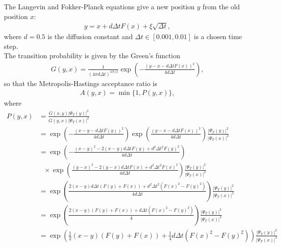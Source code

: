\documentclass[12pt]{article}
\begin{document}
\noindent The Langevin and Fokker-Planck equations give a new position $y$ from the old position $x$:
\begin{align}
y = x + d\Delta tF(x) + \xi \sqrt{\Delta t},
\end{align}
where $d=0.5$ is the diffusion constant and $\Delta t \in [0.001,0.01]$ is a chosen time step. \\

The transition probability is given by the Green's function
\begin{align}
G(y,x)=\frac{1}{(4\pi d \Delta t)^{3N/2}} \exp \left( -\frac{(y-x-d\Delta t F(x))^2}{4 d \Delta t} \right),
\end{align}
so that the Metropolis-Hastings acceptance ratio is
\begin{align}
A(y,x) = \min \{ 1, P(y,x) \},
\end{align}
where 
\begin{align*}
P(y,x) &= \frac{G(x,y) | \Psi_T(y) | ^2}{G(y,x) | \Psi_T(x) | ^2}\\
&= \exp \left( -\frac{(x-y-d\Delta t F(y))^2}{4 d \Delta t} \right) \exp \left( \frac{(y-x-d\Delta t F(x))^2}{4 d \Delta t} \right) \frac{| \Psi_T(y) | ^2}{ | \Psi_T(x) | ^2}\\
&= \exp \left( -\frac{(x-y)^2-2(x-y)d\Delta t F(y) + d^2 \Delta t^2 F(y)^2}{4d\Delta t} \right)\\
& \ \ \  \times \exp \left( \frac{(y-x)^2-2(y-x)d\Delta t F(x) + d^2 \Delta t^2 F(x)^2}{4d\Delta t} \right) \frac{| \Psi_T(y) | ^2}{ | \Psi_T(x) | ^2}\\
&= \exp \left( \frac{2(x-y)d\Delta t (F(y)+F(x)) + d^2 \Delta t^2 (F(x)^2-F(y)^2)}{4d\Delta t} \right) \frac{| \Psi_T(y) | ^2}{ | \Psi_T(x) | ^2}\\
&= \exp \left( \frac{2(x-y) (F(y)+F(x)) + d \Delta t (F(x)^2-F(y)^2)}{4} \right) \frac{| \Psi_T(y) | ^2}{ | \Psi_T(x) | ^2}\\
&= \exp \left( \frac{1}{2}(x-y) (F(y)+F(x)) + \frac{1}{4} d \Delta t (F(x)^2-F(y)^2) \right) \frac{| \Psi_T(y) | ^2}{ | \Psi_T(x) | ^2}\\
\end{align*}
\end{document}
